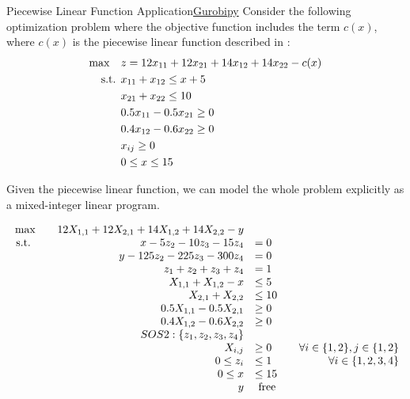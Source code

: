 \begin{examplewithcode}{Piecewise Linear Function Application}{\href{https://github.com/open-optimization/open-optimization-or-examples/blob/master/nonlinear-programming/Gurobi-SOS-Examples.ipynb}{Gurobipy}}
\label{example:pwl-application}
Consider the following optimization problem where the objective function includes the term $c(x)$, where $c(x)$ is the piecewise linear function described in :
\begin{align}
\max \quad & z = 12x_{11} + 12x_{21} + 14x_{12} + 14x_{22} - c(x) \\
\text{ s.t. }        & x_{11} + x_{12} \leq x + 5 \\
& x_{21} + x_{22} \leq 10 \\
& 0.5 x_{11} - 0.5x_{21} \geq 0 \\
& 0.4 x_{12} - 0.6 x_{22} \geq 0 \\
& x_{ij} \geq 0 \\
& 0 \leq x \leq 15
\end{align}

Given the piecewise linear function, we can model the whole problem explicitly as a mixed-integer linear program.

 \begin{equation}
 \begin{array}{rrlr}
 \max\quad & 12 X_{1,1} + 12 X_{2,1} + 14 X_{1,2} + 14 X_{2,2} - y\\
\text{ s.t. } \quad & x - 5 z_{2} - 10 z_{3} - 15 z_{4} &= 0\\
 & y - 125 z_{2} - 225 z_{3} - 300 z_{4} &= 0\\
 & z_{1} + z_{2} + z_{3} + z_{4} &= 1\\
 & X_{1,1} + X_{1,2} - x &\leq 5\\
 & X_{2,1} + X_{2,2} &\leq 10\\
 & 0.5 X_{1,1} - 0.5 X_{2,1} &\geq 0\\
 & 0.4 X_{1,2} - 0.6 X_{2,2} &\geq 0\\
 & SOS2: \{z_1, z_2, z_3, z_4\}\\
 & X_{i,j} &\geq 0 &\quad\forall i \in \{1,2\}, j \in \{1,2\}\\
 & 0 \leq z_{i} &\leq 1 &\quad\forall i \in \{1,2,3,4\}\\
 & 0 \leq x &\leq 15\\
 & y & \text{ free} \\
\end{array}
\end{equation}
\end{examplewithcode}


